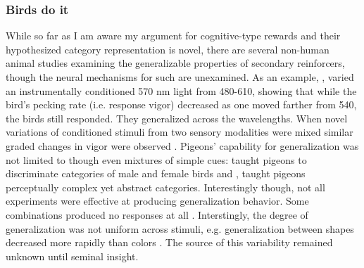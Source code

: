 \documentclass[doc,12pt]{apa}        %
\begin{document}
\subsubsection{Birds do it}
\label{subsub:birds}
While so far as I am aware my argument for cognitive-type rewards and their hypothesized category representation is novel, there are several non-human animal studies examining the generalizable properties of secondary reinforcers, though the neural mechanisms for such are unexamined.  As an example, , varied an instrumentally conditioned 570 nm light from 480-610, showing that while the bird's pecking rate (i.e. response vigor) decreased as one moved farther from 540, the birds still responded.  They generalized across the wavelengths.  When novel variations of conditioned stimuli from two sensory modalities were mixed similar graded changes in vigor were observed  \cite{Guttman:1956p8355}.  Pigeons' capability for generalization was not limited to though even mixtures of simple cues: \cite{Nakamura:2006p9093} taught pigeons to discriminate categories of male and female birds and , taught pigeons perceptually complex yet abstract categories.  Interestingly though, not all experiments were effective at producing generalization behavior.  Some combinations produced no responses at all \cite{Blough:2001p8408,Simmons:2008p8405,Urcuioli:2001p8359}.  Interstingly, the degree of generalization was not uniform across stimuli, e.g. generalization between shapes decreased more rapidly than colors .  The source of this variability remained unknown until  seminal insight.
\end{document}
